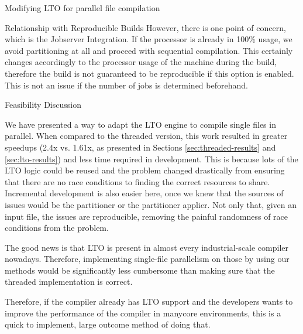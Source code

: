 \begin{section}{Modifying LTO for parallel file compilation}
\begin{subsection}{Relationship with Reproducible Builds}
However, there is one point of concern, which is the Jobserver Integration.  If
the processor is already in 100\% usage, we avoid partitioning at all and
proceed with sequential compilation. This certainly changes accordingly to the
processor usage of the machine during the build, therefore the build is not
guaranteed to be reproducible if this option is enabled. This is not an issue
if the number of jobs is determined beforehand.

\end{subsection}

\begin{subsection}{Feasibility Discussion}

We have presented a way to adapt the LTO engine to compile single files in
parallel. When compared to the threaded version, this work resulted in greater
speedups (2.4x vs. 1.61x, as presented in Sections \ref{sec:threaded-results}
and \ref{sec:lto-results}) and less time required in development. This is
because lots of the LTO logic could be reused and the problem changed
drastically from ensuring that there are no race conditions to finding the
correct resources to share. Incremental development is also easier here, once
we knew that the sources of issues would be the partitioner or the partitioner
applier. Not only that, given an input file, the issues are reproducible,
removing the painful randomness of race conditions from the problem.

The good news is that LTO is present in almost every industrial-scale compiler
nowadays. Therefore, implementing single-file parallelism on those by using our
methods would be significantly less cumbersome than making sure that the
threaded implementation is correct.

Therefore, if the compiler already has LTO support and the developers wants
to improve the performance of the compiler in manycore environments, this is a
quick to implement, large outcome method of doing that.


\end{subsection}
\end{section}

